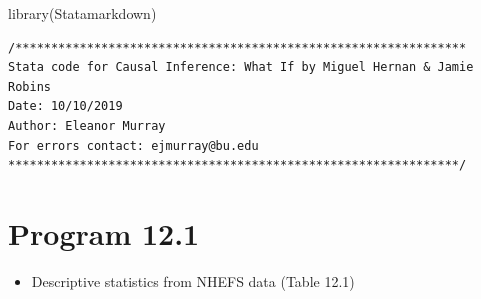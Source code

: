 \documentclass[
  10pt,
  a4paper,
]{book}
\newenvironment{Shaded}{\begin{snugshade}}{\end{snugshade}}
\newcommand{\FunctionTok}[1]{\textcolor[rgb]{0.28,0.35,0.67}{#1}}
\newcommand{\NormalTok}[1]{\textcolor[rgb]{0.00,0.46,0.62}{#1}}
\providecommand{\tightlist}{%
  \setlength{\itemsep}{0pt}\setlength{\parskip}{0pt}}
\begin{document}
\begin{Shaded}
\begin{Highlighting}[]
\FunctionTok{library}\NormalTok{(Statamarkdown)}
\end{Highlighting}
\end{Shaded}

\begin{verbatim}
/***************************************************************
Stata code for Causal Inference: What If by Miguel Hernan & Jamie Robins
Date: 10/10/2019
Author: Eleanor Murray 
For errors contact: ejmurray@bu.edu
***************************************************************/
\end{verbatim}

\hypertarget{program-12.1-1}{%
\section{Program 12.1}\label{program-12.1-1}}

\begin{itemize}
\tightlist
\item
  Descriptive statistics from NHEFS data (Table 12.1)
\end{itemize}
\end{document}
